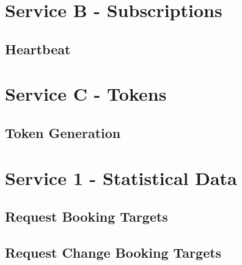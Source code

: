 \section{Service B - Subscriptions}
\label{sec:Nachrichten:DienstB}

\subsection*{Heartbeat}
\label{subsec:Nachrichten:DienstB:HeartBeat}





\section{Service C - Tokens}
\label{sec:Nachrichten:DienstC}

\subsection*{Token Generation}
\label{subsec:Nachrichten:DienstC:Tokengenerierung}





\section{Service 1 - Statistical Data}
\label{sec:Nachrichten:Dienst1}

\subsection*{Request Booking Targets}
\label{subsec:Nachrichten:Dienst1:BookingTargets}





\subsection*{Request Change Booking Targets}
\label{subsec:Nachrichten:Dienst1:ChangeProviders}





